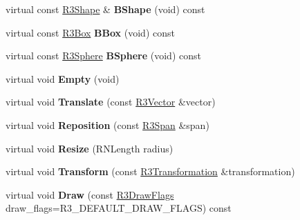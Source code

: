 \begin{DoxyCompactItemize}
\item 
virtual const \hyperlink{class_r3_shape}{R3\+Shape} \& {\bfseries B\+Shape} (void) const \hypertarget{class_r3_cylinder_aa736079c814e29277370e02d13c9d9a4}{}\label{class_r3_cylinder_aa736079c814e29277370e02d13c9d9a4}

\item 
virtual const \hyperlink{class_r3_box}{R3\+Box} {\bfseries B\+Box} (void) const \hypertarget{class_r3_cylinder_afbbf0f01b24e42d9db5f4ec5d1269004}{}\label{class_r3_cylinder_afbbf0f01b24e42d9db5f4ec5d1269004}

\item 
virtual const \hyperlink{class_r3_sphere}{R3\+Sphere} {\bfseries B\+Sphere} (void) const \hypertarget{class_r3_cylinder_ac97df50f5f48cd7a444ac80dc1ea4054}{}\label{class_r3_cylinder_ac97df50f5f48cd7a444ac80dc1ea4054}

\item 
virtual void {\bfseries Empty} (void)\hypertarget{class_r3_cylinder_ab8fce3ce06bd641b3848c043fed0388e}{}\label{class_r3_cylinder_ab8fce3ce06bd641b3848c043fed0388e}

\item 
virtual void {\bfseries Translate} (const \hyperlink{class_r3_vector}{R3\+Vector} \&vector)\hypertarget{class_r3_cylinder_ae7ecfdd8c99f067d82b3020e07ee34ff}{}\label{class_r3_cylinder_ae7ecfdd8c99f067d82b3020e07ee34ff}

\item 
virtual void {\bfseries Reposition} (const \hyperlink{class_r3_span}{R3\+Span} \&span)\hypertarget{class_r3_cylinder_a783f9746c9ba0cb0d051a57c335d0c54}{}\label{class_r3_cylinder_a783f9746c9ba0cb0d051a57c335d0c54}

\item 
virtual void {\bfseries Resize} (R\+N\+Length radius)\hypertarget{class_r3_cylinder_af4deec6d1807b9a294197e1f3d9e079f}{}\label{class_r3_cylinder_af4deec6d1807b9a294197e1f3d9e079f}

\item 
virtual void {\bfseries Transform} (const \hyperlink{class_r3_transformation}{R3\+Transformation} \&transformation)\hypertarget{class_r3_cylinder_a3143c31494229b9883b044ae6bfdde00}{}\label{class_r3_cylinder_a3143c31494229b9883b044ae6bfdde00}

\item 
virtual void {\bfseries Draw} (const \hyperlink{class_r_n_flags}{R3\+Draw\+Flags} draw\+\_\+flags=R3\+\_\+\+D\+E\+F\+A\+U\+L\+T\+\_\+\+D\+R\+A\+W\+\_\+\+F\+L\+A\+GS) const \hypertarget{class_r3_cylinder_a435b3dbe6d558cbdeeaa21ddf4181c76}{}\label{class_r3_cylinder_a435b3dbe6d558cbdeeaa21ddf4181c76}


\end{DoxyCompactItemize}
